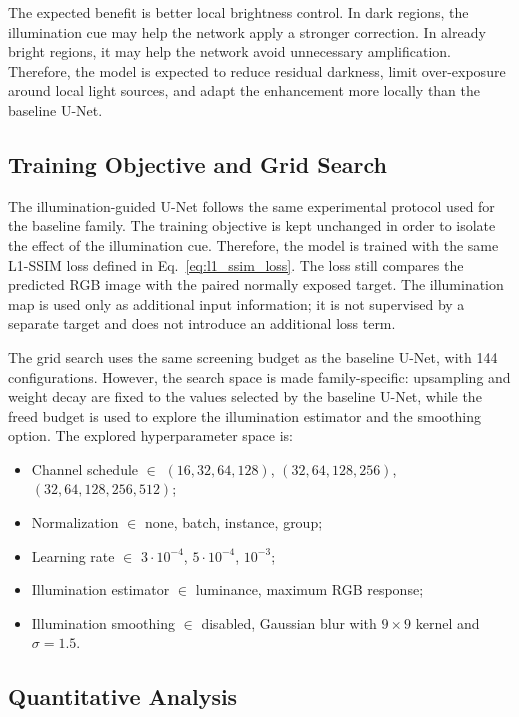 The expected benefit is better local brightness control. In dark regions, the illumination cue may help the network apply a stronger correction. In already bright regions, it may help the network avoid unnecessary amplification. Therefore, the model is expected to reduce residual darkness, limit over-exposure around local light sources, and adapt the enhancement more locally than the baseline U-Net.

\subsection{Training Objective and Grid Search}

The illumination-guided U-Net follows the same experimental protocol used for the baseline family. The training objective is kept unchanged in order to isolate the effect of the illumination cue. Therefore, the model is trained with the same L1-SSIM loss defined in Eq.~\ref{eq:l1_ssim_loss}. The loss still compares the predicted RGB image with the paired normally exposed target. The illumination map is used only as additional input information; it is not supervised by a separate target and does not introduce an additional loss term.

The grid search uses the same screening budget as the baseline U-Net, with 144 configurations. However, the search space is made family-specific: upsampling and weight decay are fixed to the values selected by the baseline U-Net, while the freed budget is used to explore the illumination estimator and the smoothing option. The explored hyperparameter space is:

\begin{itemize}[topsep=5pt]
	\item Channel schedule $\in$ $(16,32,64,128)$, $(32,64,128,256)$, $(32,64,128,256,512)$;
	\item Normalization $\in$ none, batch, instance, group;
	\item Learning rate $\in$ $3{\cdot}10^{-4}$, $5{\cdot}10^{-4}$, $10^{-3}$;
	\item Illumination estimator $\in$ luminance, maximum RGB response;
	\item Illumination smoothing $\in$ disabled, Gaussian blur with $9 \times 9$ kernel and $\sigma = 1.5$.
\end{itemize}

\subsection{Quantitative Analysis}

